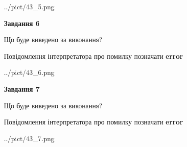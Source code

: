 \documentclass[10pt, ukrainian]{article}
\begin{document}
{\begin {large}
\begin{center}
	{../pict/43_5.png}
\end{center}
\newpage

{\begin {center}\textbf{Завдання 6}\end {center}}\par
Що буде виведено за виконання? \par
Повідомлення інтерпретатора про помилку позначати \textbf{error}

\begin{center}
	{../pict/43_6.png}
\end{center}
\newpage

{\begin {center}\textbf{Завдання 7}\end {center}}\par
Що буде виведено за виконання? \par
Повідомлення інтерпретатора про помилку позначати \textbf{error}

\begin{center}
	{../pict/43_7.png}
\end{center}
\newpage

\end {large}}
\end{document}
